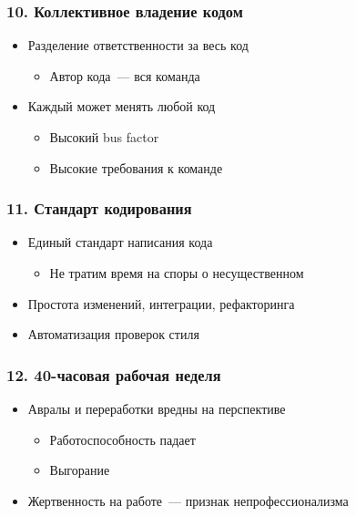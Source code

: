 \documentclass{../../slides-style}
\begin{document}
    \begin{frame}
        \frametitle{10. Коллективное владение кодом}
        \begin{itemize}
            \item Разделение ответственности за весь код
            \begin{itemize}
                \item Автор кода~--- вся команда
            \end{itemize}
            \item Каждый может менять любой код
            \begin{itemize}
                \item Высокий bus factor 
                \item Высокие требования к команде
            \end{itemize}
        \end{itemize}
    \end{frame}

    \begin{frame}
        \frametitle{11. Стандарт кодирования}
        \begin{itemize}
            \item Единый стандарт написания кода
            \begin{itemize}
                \item Не тратим время на споры о несущественном
            \end{itemize}
            \item Простота изменений, интеграции, рефакторинга
            \item Автоматизация проверок стиля
        \end{itemize}
    \end{frame}

    \begin{frame}
        \frametitle{12. 40-часовая рабочая неделя}
        \begin{itemize}
            \item Авралы и переработки вредны на перспективе
            \begin{itemize}
                \item Работоспособность падает
                \item Выгорание
            \end{itemize}
            \item Жертвенность на работе~--- признак непрофессионализма
        \end{itemize}
    \end{frame}
\end{document}

